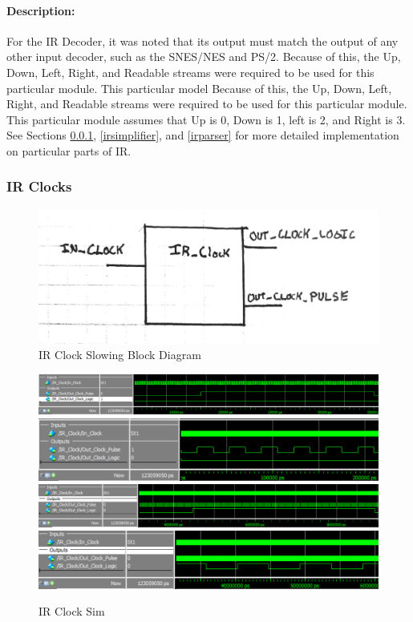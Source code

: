 \documentclass[]{article}
\begin{document}
\paragraph{Description:} For the IR Decoder, it was noted that its output must match the output of any other input decoder, such as the SNES/NES and PS/2.
Because of this, the Up, Down, Left, Right, and Readable streams were required to be used for this particular module. This particular model 
Because of this, the Up, Down, Left, Right, and Readable streams were required to be used for this particular module.
This particular module assumes that Up is 0, Down is 1, left is 2, and Right is 3. See Sections \ref{irclocks}, \ref{irsimplifier},
and \ref{irparser} for more detailed implementation on particular parts of IR.


\subsubsection{IR Clocks}
\label{irclocks}
\begin{figure}[H]\centering
    \includegraphics[width=0.9\linewidth]{figures/IR_Clock_Block.jpg}
    \caption{IR Clock Slowing Block Diagram}
    \label{fig:irClockBlock}
\end{figure}
\begin{figure}[H]\centering
    \includegraphics[width=\linewidth]{figures/IR_Clock_Sim1}
    \includegraphics[width=\linewidth]{figures/IR_Clock_Sim2}
    \includegraphics[width=\linewidth]{figures/IR_Clock_Sim3}
    \includegraphics[width=\linewidth]{figures/IR_Clock_Sim4}
    \caption{IR Clock Sim}
    \label{fig:asyncIRData}
\end{figure}
\end{document}
